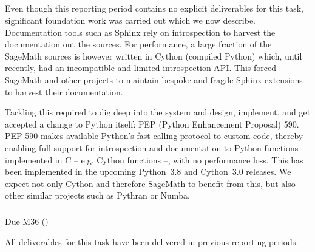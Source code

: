 \subparagraph{}
\label{UI@sage-sphinx}

Even though this reporting period contains no explicit deliverables
for this task, significant foundation work was carried out which we
now describe. Documentation tools such as Sphinx rely on introspection
to harvest the documentation out the sources. For performance, a large
fraction of the SageMath sources is however written in Cython
(compiled Python) which, until recently, had an incompatible and
limited introspection API. This forced SageMath and other projects to
maintain bespoke and fragile Sphinx extensions to harvest their
documentation.

Tackling this required to dig deep into the system and design,
implement, and get accepted a change to Python itself: PEP (Python
Enhancement Proposal) 590. PEP 590 makes available Python's fast
calling protocol to custom code, thereby enabling full support for
introspection and documentation to Python functions implemented in C
-- e.g. Cython functions --, with no performance loss. This has been
implemented in the upcoming Python~3.8 and Cython~3.0 releases. We
expect not only Cython and therefore SageMath to benefit from this,
but also other similar projects such as Pythran or Numba.

\subparagraph{} Due M36 ()
\label{UI@dynamic-inspect}

All deliverables for this task have been delivered in previous reporting periods.


\subparagraph{}
\label{UI@structdocs}

